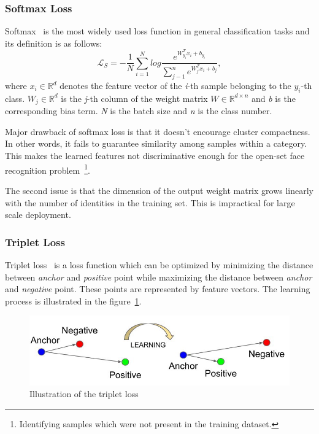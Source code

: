 \subsubsection{Softmax Loss}\label{subsubsec:softmax-loss}
Softmax~\cite{ArcFace} is the most widely used loss function in general classification tasks and its definition is as
follows:
\begin{equation}
    \label{eq:softmax}
    \mathcal{L}_S = -\frac{1}{N} \sum_{i=1}^{N} log \frac{e^{W^T_{y_i} x_{i} + b_{y_i}}}
    {\sum_{j-1}^{n} e^{W^T_{j} x_{i} + b_{j}}},
\end{equation}
where $x_i \in \mathbb{R}^{d}$ denotes the feature vector of the \textit{i}-th sample belonging to the $y_i$-th class.
$W_j \in \mathbb{R}^{d}$ is the \textit{j}-th column of the weight matrix $W \in \mathbb{R}^{d \times n}$ and \textit{b}
is the corresponding bias term.
\textit{N} is the batch size and \textit{n} is the class number.

Major drawback of softmax loss is that it doesn't encourage cluster compactness.
In other words, it fails to guarantee similarity among samples within a category.
This makes the learned features not discriminative enough for the open-set face recognition
problem~\footnote{Identifying samples which were not present in the training dataset.}.

The second issue is that the dimension of the output weight matrix grows linearly with the number of identities in the
training set.
This is impractical for large scale deployment.

\subsubsection{Triplet Loss}\label{subsubsec:triplet-loss}
Triplet loss~\cite{TripletLoss} is a loss function which can be optimized by minimizing the distance between
\textit{anchor} and \textit{positive} point while maximizing the distance between \textit{anchor} and \textit{negative}
point.
These points are represented by feature vectors.
The learning process is illustrated in the figure~\ref{fig:tripletloss}.

\begin{figure}[H]
    \centering
    \includegraphics[width=\columnwidth]{images/face-recognition/tripletloss.jpeg}
    \caption{Illustration of the triplet loss~\cite{TripletLoss}}
    \label{fig:tripletloss}
\end{figure}

